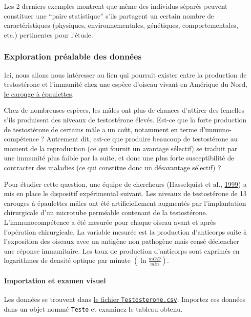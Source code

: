 \documentclass[a4paperpaper,]{article}
\let\oldparagraph\paragraph
\renewcommand{\paragraph}[1]{\oldparagraph{#1}\mbox{}}
\begin{document}
Les 2 derniers exemples montrent que même des individus séparés peuvent constituer une ``paire statistique'' s'ils partagent un certain nombre de caractéristiques (physiques, environnementales, génétiques, comportementales, etc.) pertinentes pour l'étude.

\hypertarget{Explo2}{%
\subsubsection{Exploration préalable des données}\label{Explo2}}

Ici, nous allons nous intéresser au lien qui pourrait exister entre la production de testostérone et l'immunité chez une espèce d'oiseau vivant en Amérique du Nord, \href{https://fr.wikipedia.org/wiki/Carouge_à_épaulettes}{le carouge à épaulettes}.

Chez de nombreuses espèces, les mâles ont plus de chances d'attirer des femelles s'ils produisent des niveaux de testostérone élevés. Est-ce que la forte production de testostérone de certains mâle a un coût, notamment en terme d'immuno-compétence ? Autrement dit, est-ce que produire beaucoup de testostérone au moment de la reproduction (ce qui fournit un avantage sélectif) se traduit par une immunité plus faible par la suite, et donc une plus forte susceptibilité de contracter des maladies (ce qui constitue donc un désavantage sélectif) ?

Pour étudier cette question, une équipe de chercheurs (Hasselquist et al., \protect\hyperlink{ref-Hasselquist1999}{1999}) a mis en place le dispositif expérimental suivant. Les niveaux de testostérone de 13 carouges à épaulettes mâles ont été artificiellement augmentés par l'implantation chirurgicale d'un microtube perméable contenant de la testostérone. L'immunocompétence a été mesurée pour chaque oiseau avant et après l'opération chirurgicale. La variable mesurée est la production d'anticorps suite à l'exposition des oiseaux avec un antigène non pathogène mais censé déclencher une réponse immunitaire. Les taux de production d'anticorps sont exprimés en logarithmes de densité optique par minute \(\left(\ln\frac{mOD}{min}\right)\).

\hypertarget{importation-et-examen-visuel-1}{%
\paragraph{Importation et examen visuel}\label{importation-et-examen-visuel-1}}

Les données se trouvent dans \href{https://besibo.github.io/Biometrie3/data/Testosterone.csv}{le fichier \texttt{Testosterone.csv}}. Importez ces données dans un objet nommé \texttt{Testo} et examinez le tableau obtenu.
\end{document}
